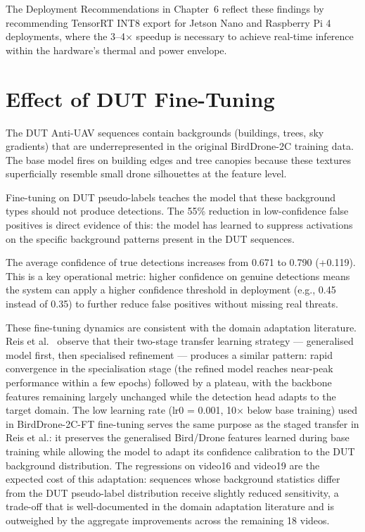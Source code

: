 \documentclass[12pt,a4paper]{report}
\begin{document}
The Deployment Recommendations in Chapter~6 reflect these findings by
recommending TensorRT INT8 export for Jetson Nano and Raspberry Pi 4
deployments, where the 3--4$\times$ speedup is necessary to achieve
real-time inference within the hardware's thermal and power envelope.

\section{Effect of DUT Fine-Tuning}

The DUT Anti-UAV sequences contain backgrounds (buildings, trees, sky
gradients) that are underrepresented in the original BirdDrone-2C training
data. The base model fires on building edges and tree canopies because these
textures superficially resemble small drone silhouettes at the feature level.

Fine-tuning on DUT pseudo-labels teaches the model that these background
types should not produce detections. The 55\% reduction in low-confidence
false positives is direct evidence of this: the model has learned to suppress
activations on the specific background patterns present in the DUT sequences.

The average confidence of true detections increases from 0.671 to 0.790
(+0.119). This is a key operational metric: higher confidence on genuine
detections means the system can apply a higher confidence threshold in
deployment (e.g., 0.45 instead of 0.35) to further reduce false positives
without missing real threats.

These fine-tuning dynamics are consistent with the domain adaptation
literature. Reis et al.~\cite{reis2024yolov8} observe that their two-stage
transfer learning strategy --- generalised model first, then specialised
refinement --- produces a similar pattern: rapid convergence in the
specialisation stage (the refined model reaches near-peak performance
within a few epochs) followed by a plateau, with the backbone features
remaining largely unchanged while the detection head adapts to the
target domain. The low learning rate (lr0 = 0.001, 10$\times$ below
base training) used in BirdDrone-2C-FT fine-tuning serves the same
purpose as the staged transfer in Reis et al.: it preserves the
generalised Bird/Drone features learned during base training while
allowing the model to adapt its confidence calibration to the DUT
background distribution. The regressions on video16 and video19 are
the expected cost of this adaptation: sequences whose background
statistics differ from the DUT pseudo-label distribution receive
slightly reduced sensitivity, a trade-off that is well-documented in
the domain adaptation literature and is outweighed by the aggregate
improvements across the remaining 18 videos.
\end{document}
